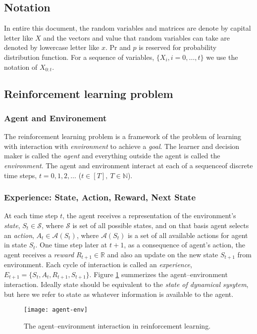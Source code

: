 \documentclass[letterpaper,titlepage]{article}
\begin{document}
\subsection{Notation}
In entire this document, the random variables and matrices are denote by capital letter like $X$ and the vectors and value that random variables can take are denoted by lowercase letter like $x$. $\textrm{Pr}$ and $p$ is reserved for probability  distribution function. For a sequence of variables, $\{ X_i , i=0,\dots,t \}$ we use the notation of $X_{0:t}$.
\subsection{Reinforcement learning problem}
\label{sec:RL}
\subsubsection*{Agent and Environement}
The reinforcement learning problem is a framework of the problem of learning with interaction with \emph{environment} to achieve a \emph{goal}. The learner and decision maker is called the \emph{agent} and everything outside the agent is called the \emph{environment}. The agent and environment interact at each of a sequenceof discrete time steps, $t = 0,1,2,\dots$ ($t \in [T],~T \in \mathbb{N}$). 
\subsubsection*{Experience: State, Action, Reward, Next State}
At each time step $t$, the agent receives a representation of the environment's \emph{state}, $S_t \in \mathcal{S}$, where $\mathcal{S}$ is set of all possible states, and on that basis agent selects an \emph{action}, $A_t \in \mathcal{A}(S_t)$, where $\mathcal{A}(S_t)$ is a set of all available actions for agent in state $S_t$. One time step later at $t+1$, as a consequence of agent's action, the agent receives a \emph{reward} $R_{t+1} \in \mathbb{R}$  and also an update on the new state $S_{t+1}$ from environment. Each cycle of interaction is called an \emph{experience}, $E_{t+1} = \{ S_t,A_t,R_{t+1}, S_{t+1} \}$. Figure \ref{f:agent-env} summerizes the agent--environment interaction. Ideally state should be equivalent to the \emph{state of dynamical sysytem}, but here we refer to state as whatever information is available to the agent.  

\begin{figure}[H]
\centering
\texttt{[image: agent-env]}
\caption{The agent--environment interaction in reinforcement learning.}
\label{f:agent-env}
\end{figure}
\end{document}
